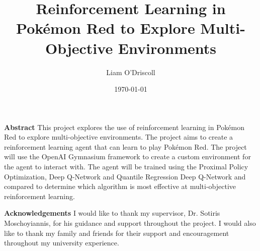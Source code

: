 \documentclass[11pt]{surrey_disso_style}
\title{Reinforcement Learning in Pokémon Red to Explore Multi-Objective Environments}
\author{Liam O'Driscoll}
\date{\today}
\begin{document}
\maketitle


\noindent\LARGE\textbf{Abstract}
\normalsize
\vspace{0.5cm}
\newline
This project explores the use of reinforcement learning in Pokémon Red to explore multi-objective environments. The project aims to create a reinforcement learning agent that can learn to play Pokémon Red. The project will use the OpenAI Gymnasium framework to create a custom environment for the agent to interact with. The agent will be trained using the Proximal Policy Optimization, Deep Q-Network and Quantile Regression Deep Q-Network and compared to determine which algorithm is most effective at multi-objective reinforcement learning. 



\noindent\LARGE\textbf{Acknowledgements}
\normalsize
\vspace{0.5cm}
\newline
I would like to thank my supervisor, Dr. Sotiris Moschoyiannis, for his guidance and support throughout the project. I would also like to thank my family and friends for their support and encouragement throughout my university experience. 

\newpage

\tableofcontents











\end{document}
